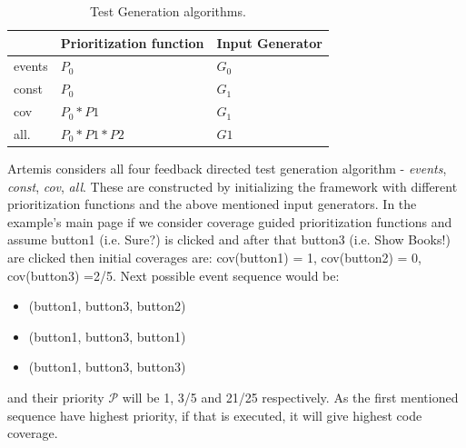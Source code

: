 \documentclass[authoryear,preprint, twocolumn]{sigplanconf}
\begin{document}
\begin{table}[ht]
	\centering
	\begin{tabular}{lll}
		\hline
		\textbf{} & \textbf{Prioritization function} & \textbf{Input Generator}\\
		\hline
		events	& $P_0$	& $G_0$\\
		\hline
		const	& $P_0$	& $G_1$\\
		\hline
		cov		& $P_0*P1$	& $G_1$\\
		\hline
		all.	& $P_0*P1*P2$	& $G1$\\
	\end{tabular}
	\caption[Test Generation algorithms]{\label{t:testGenerators}Test Generation algorithms.}
\end{table}

\newline Artemis considers all four feedback directed test generation algorithm - \emph{events}, \emph{const}, \emph{cov}, \emph{all}. These are constructed by initializing the framework with different prioritization functions and the above mentioned input generators. In the example's main page if we consider coverage guided prioritization functions and assume button1 (i.e. Sure?) is clicked and after that button3 (i.e. Show Books!) are clicked then initial coverages are: cov(button1) = 1, cov(button2) = 0, cov(button3) =2/5.
\newline Next possible event sequence would be: 
\begin{itemize}
	\item (button1, button3, button2) 
	\item (button1, button3, button1)
	\item (button1, button3, button3) 
\end{itemize}
and their priority $\mathcal{P}$ will be 1, 3/5 and 21/25 respectively. As the first mentioned sequence have highest priority, if that is executed, it will give highest code coverage.


\end{document}
